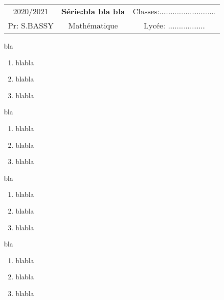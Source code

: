 \documentclass[12pt,a4paper]{report}
\begin{document}
\begin{tcolorbox}[]
 \begin{center}
 \begin{tabular}{c c  c}
 2020/2021  \hspace*{2.5cm}   & \textbf{{\Large Série:bla bla bla  }} &  \hspace*{1.7cm} Classes:.......................... \\
 Pr: S.BASSY\hspace*{2cm} &Mathématique & \hspace*{1.7cm}Lycée: .................
 \end{tabular}
\end{center}
\end{tcolorbox}
\vskip0.5cm
\begin{mybox}
bla 
\begin{enumerate}
 \item blabla
 \item blabla
 \item blabla
\end{enumerate}
\end{mybox}
\begin{mybox}
 bla 
 \begin{enumerate}
 \item blabla
 \item blabla
 \item blabla
 \end{enumerate}
\end{mybox}
\begin{mybox}
 bla 
 \begin{enumerate}
 \item blabla
 \item blabla
 \item blabla
 \end{enumerate}
\end{mybox}
\begin{mybox}
 bla 
 \begin{enumerate}
 \item blabla
 \item blabla
 \item blabla
 \end{enumerate}
\end{mybox}
\end{document}
